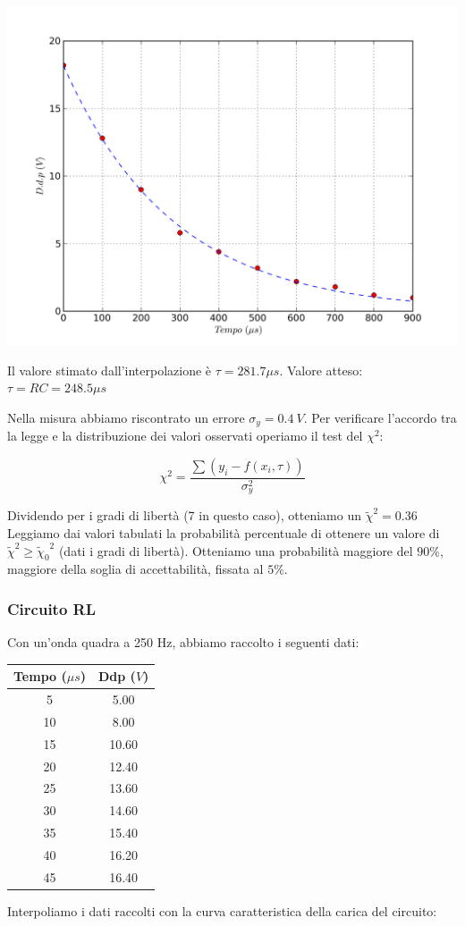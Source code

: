 \begin{center}
 \includegraphics[scale=0.70]{grafici/C3/fitcond.png}
\end{center}

Il valore stimato dall'interpolazione è $\tau=281.7 \mu s$.
Valore atteso: $\tau=RC=248.5 \mu s$

Nella misura abbiamo riscontrato un errore $\sigma_y= 0.4\ V$.
Per verificare l'accordo tra la legge e la distribuzione dei valori osservati operiamo il test del $\chi^2$:

$$ \chi^2 = \frac{\sum{(y_i - f(x_i,\tau ))}}{\sigma_y^2} $$

Dividendo per i gradi di libertà (7 in questo caso), otteniamo un $\tilde{\chi}^2 = 0.36 $ \\
Leggiamo dai valori tabulati la probabilità percentuale di ottenere un valore di $\tilde{\chi}^2 \geq {\tilde{\chi}_0}^2 $ (dati i gradi di libertà). Otteniamo una probabilità maggiore del $90\%$, maggiore della soglia di accettabilità, fissata al $5\%$. 


\subsubsection{Circuito RL}
Con un'onda quadra a 250 Hz, abbiamo raccolto i seguenti dati:

\begin{center}
\begin{tabular}{*{2}{c}}
Tempo ($\mu s$) & Ddp ($V$) \\
\midrule
5 & 5.00 \\
10 & 8.00 \\
15 & 10.60 \\
20 & 12.40 \\
25 & 13.60 \\
30 & 14.60 \\
35 & 15.40 \\
40 & 16.20 \\
45 & 16.40 \\
\end{tabular}
\end{center}
Interpoliamo i dati raccolti con la curva caratteristica della carica del circuito:

